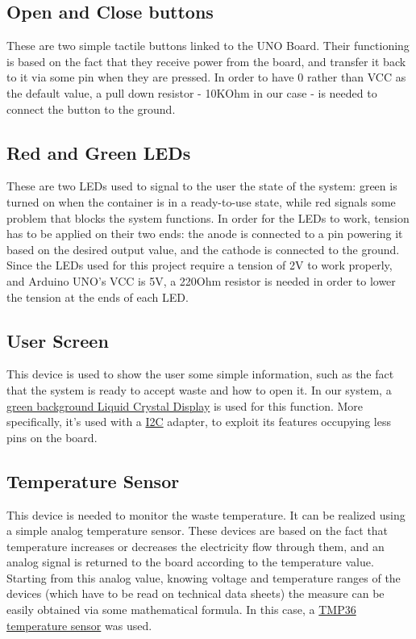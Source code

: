 \documentclass[a4paper,12pt]{report}
\begin{document}
	\subsection{Open and Close buttons}
	These are two simple tactile buttons linked to the UNO Board.\newline
	Their functioning is based on the fact that they receive power from the board, and transfer it back to it via some pin when they are pressed. In order to have 0 rather than VCC as the default value, a pull down resistor - 10KOhm in our case - is needed to connect the button to the ground.
	
	\subsection{Red and Green LEDs}
	These are two LEDs used to signal to the user the state of the system: green is turned on when the container is in a ready-to-use state, while red signals some problem that blocks the system functions.\newline
	In order for the LEDs to work, tension has to be applied on their two ends: the anode is connected to a pin powering it based on the desired output value, and the cathode is connected to the ground. Since the LEDs used for this project require a tension of 2V to work properly, and Arduino UNO's VCC is 5V, a 220Ohm resistor is needed in order to lower the tension at the ends of each LED.
	
	\subsection{User Screen}
	This device is used to show the user some simple information, such as the fact that the system is ready to accept waste and how to open it.\newline
	In our system, a \href{https://robot-italy.com/products/16x2-lcd-display-green?_pos=3&_psq=display+lcd&_ss=e&_v=1.0}{green background Liquid Crystal Display} is used for this function. More specifically, it's used with a \href{https://en.wikipedia.org/wiki/I%C2%B2C}{I2C} adapter, to exploit its features occupying less pins on the board.
	
	\subsection{Temperature Sensor}
	This device is needed to monitor the waste temperature.\newline
	It can be realized using a simple analog temperature sensor. These devices are based on the fact that temperature increases or decreases the electricity flow through them, and an analog signal is returned to the board according to the temperature value. Starting from this analog value, knowing voltage and temperature ranges of the devices (which have to be read on technical data sheets) the measure can be easily obtained via some mathematical formula. In this case, a \href{https://www.analog.com/en/products/tmp36.html?doc=TMP35_36_37.pdf#part-details}{TMP36 temperature sensor} was used.
	
\end{document}
